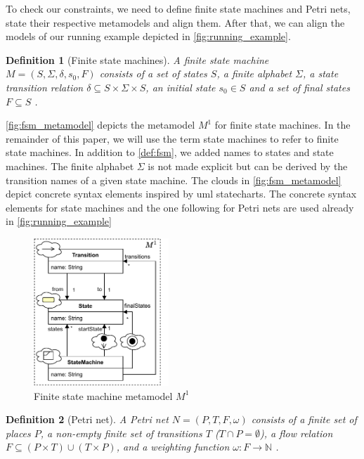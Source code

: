 \documentclass[conference]{IEEEtran}
\newtheorem{definition}{Definition}
\begin{document}
To check our constraints, we need to define finite state machines and Petri nets, state their respective metamodels and align them.
After that, we can align the models of our running example depicted in \autoref{fig:running_example}.

\begin{definition}[Finite state machines] \label{def:fsm}
    A finite state machine $M=(S, \Sigma, \delta, s_0, F)$ consists of a set of states $S$, a finite alphabet $\Sigma$, a state transition relation $\delta \subseteq S \times \Sigma \times S$, an initial state $s_0 \in S$ and a set of final states $F \subseteq S$ \cite{kunzeBehaviouralModelsModelling2016}. %
\end{definition}

\autoref{fig:fsm_metamodel} depicts the metamodel $M^1$ for finite state machines.
In the remainder of this paper, we will use the term state machines to refer to finite state machines.
In addition to \autoref{def:fsm}, we added names to states and state machines.
The finite alphabet $\Sigma$ is not made explicit but can be derived by the transition names of a given state machine.
The clouds in \autoref{fig:fsm_metamodel} depict concrete syntax elements inspired by \gls{uml} statecharts.
The concrete syntax elements for state machines and the one following for Petri nets are used already in \autoref{fig:running_example}

\begin{figure}[h]
    \centering
    \includegraphics[width=2in]{state_machine_metamodel}
    \caption{Finite state machine metamodel $M^1$}
    \label{fig:fsm_metamodel}
\end{figure}

\begin{definition}[Petri net] \label{def:pn}
    A Petri net $N=(P,T,F, \omega)$ consists of a finite set of places $P$, a non-empty finite set of transitions $T$ ($T \cap P = \emptyset $), a flow relation $F \subseteq (P \times T) \cup (T \times P)$, and a weighting function $\omega: F \to \mathbb{N}$ \cite{kunzeBehaviouralModelsModelling2016}. %
\end{definition}
\end{document}
